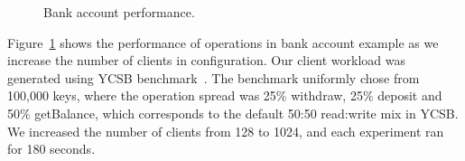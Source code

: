 \begin{figure}[t]
  \centering
	\caption{Bank account performance.}
  \label{grf:BA}
\end{figure}


Figure~\ref{grf:BA} shows the performance of operations in bank account example
as we increase the number of clients in  configuration. Our client
workload was generated using YCSB benchmark~\cite{YCSB}. The benchmark
uniformly chose from 100,000 keys, where the operation spread was 25\%
withdraw, 25\% deposit and 50\% getBalance, which corresponds to the default
50:50 read:write mix in YCSB. We increased the number of clients from 128 to
1024, and each experiment ran for 180 seconds.

